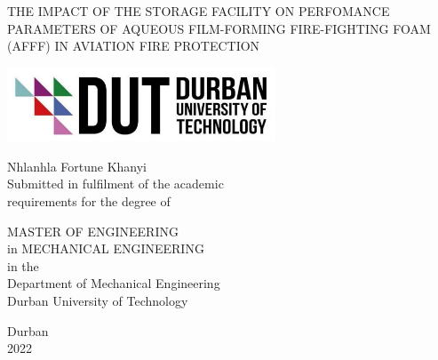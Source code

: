 \begin{titlepage}
\begin{center}
    \doublespacing
    \vspace*{1cm}

    \large
    THE IMPACT OF THE STORAGE FACILITY ON PERFOMANCE PARAMETERS OF AQUEOUS FILM-FORMING FIRE-FIGHTING FOAM (AFFF) IN AVIATION FIRE PROTECTION

    \vspace{2cm}

    \includegraphics[width=0.6\textwidth]{images/logo.png}

    \Large
    Nhlanhla Fortune Khanyi \\
    
    \large
    Submitted in fulfilment of the academic\\
    requirements for the degree of

    \vspace{1.5cm}

    MASTER OF ENGINEERING \\
    in MECHANICAL ENGINEERING \\
    in the \\

    Department of Mechanical Engineering \\
    Durban University of Technology

    \vspace{1cm}

    \normalsize
    Durban \\
    2022

\end{center}
\end{titlepage}